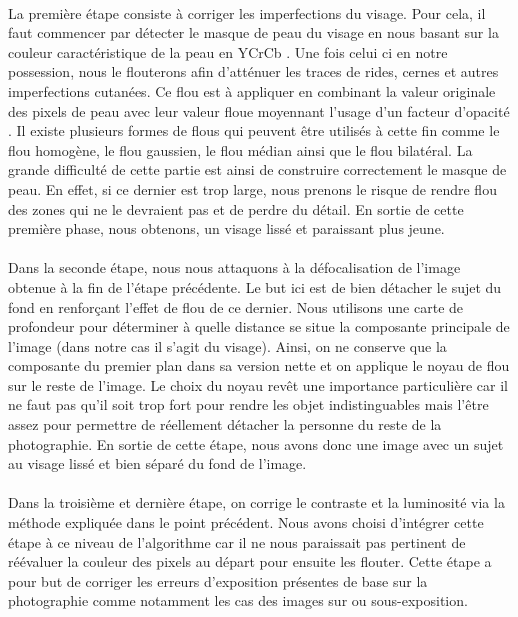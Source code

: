 \documentclass[11pt, french]{report-rd-info}
\begin{document}
\paragraph*{}
La première étape consiste à corriger les imperfections du visage.
Pour cela, il faut commencer par détecter le masque de peau du visage en nous basant sur la couleur caractéristique de la peau en YCrCb \cite{Kukharev2004}. 
Une fois celui ci en notre possession, nous le flouterons afin d'atténuer les traces de rides, cernes et autres imperfections cutanées. Ce flou est à appliquer en combinant la valeur originale des pixels de peau avec leur valeur floue moyennant l'usage d'un facteur d'opacité \cite{Lee}. Il existe plusieurs formes de flous qui peuvent être utilisés à cette fin comme le flou homogène, le flou gaussien, le flou médian ainsi que le flou bilatéral.
La grande difficulté de cette partie est ainsi de construire correctement le masque de peau. En effet, si ce dernier est trop large, nous prenons le risque de rendre flou des zones qui ne le devraient pas et de perdre du détail.
En sortie de cette première phase, nous obtenons, un visage lissé et paraissant plus jeune.
\paragraph*{}
Dans la seconde étape, nous nous attaquons à la défocalisation de l'image obtenue à la fin de l'étape précédente. Le but ici est de bien détacher le sujet du fond en renforçant l'effet de flou de ce dernier.
Nous utilisons une carte de profondeur \cite{Zhuo2011} pour déterminer à quelle distance se situe la composante principale de l'image (dans notre cas il s'agit du visage).
Ainsi, on ne conserve que la composante du premier plan dans sa version nette et on applique le noyau de flou sur le reste de l'image.
Le choix du noyau revêt une importance particulière car il ne faut pas qu'il soit trop fort pour rendre les objet indistinguables mais l'être assez pour permettre de réellement détacher la personne du reste de la photographie.
En sortie de cette étape, nous avons donc une image avec un sujet au visage lissé et bien séparé du fond de l'image.
\paragraph*{}
Dans la troisième et dernière étape, on corrige le contraste et la luminosité via la méthode expliquée dans le point précédent. 
Nous avons choisi d'intégrer cette étape à ce niveau de l'algorithme car il ne nous paraissait pas pertinent de réévaluer la couleur des pixels au départ pour ensuite les flouter.
Cette étape a pour but de corriger les erreurs d'exposition présentes de base sur la photographie comme notamment les cas des images sur ou sous-exposition. 
\end{document}
